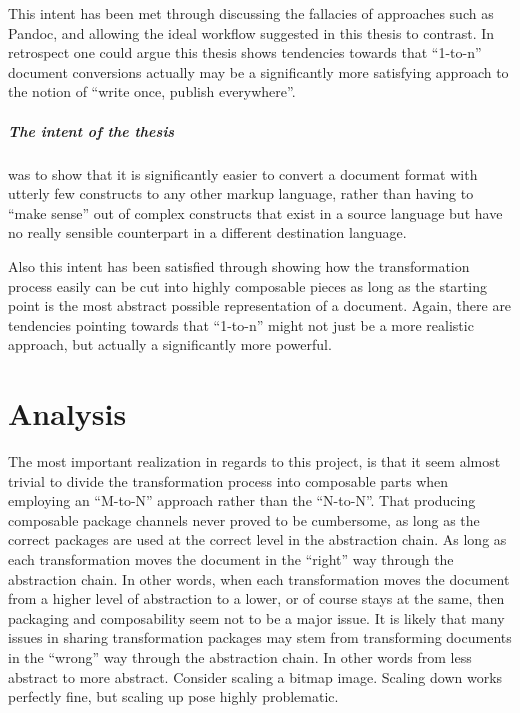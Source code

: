 \documentclass{scrreprt}
\begin{document}
This intent has been met through discussing the fallacies of approaches such as Pandoc, and allowing the ideal workflow suggested in this thesis to contrast. In retrospect one could argue this thesis shows tendencies towards that ``1-to-n'' document conversions actually may be a significantly more satisfying approach to the notion of ``write once, publish everywhere''.


\paragraph{The intent of the thesis}
was to show that it is significantly easier to convert a document format with utterly few constructs to any other markup language, rather than having to ``make sense'' out of complex constructs that exist in a source language but have no really sensible counterpart in a different destination language.

Also this intent has been satisfied through showing how the transformation process easily can be cut into highly composable pieces as long as the starting point is the most abstract possible representation of a document. Again, there are tendencies pointing towards that ``1-to-n'' might not just be a more realistic approach, but actually a significantly more powerful.

















%
%
%
%
%
%


\chapter{Analysis}
The most important realization in regards to this project, is that it seem almost trivial to divide the transformation process into composable parts when employing an ``M-to-N'' approach rather than the ``N-to-N''. That producing composable package channels never proved to be cumbersome, as long as the correct packages are used at the correct level in the abstraction chain. As long as each transformation moves the document in the ``right'' way through the abstraction chain. In other words, when each transformation moves the document from a higher level of abstraction to a lower, or of course stays at the same, then packaging and composability seem not to be a major issue. It is likely that many issues in sharing transformation packages may stem from transforming documents in the ``wrong'' way through the abstraction chain. In other words from less abstract to more abstract. Consider scaling a bitmap image. Scaling down works perfectly fine, but scaling up pose highly problematic.
 
\end{document}
